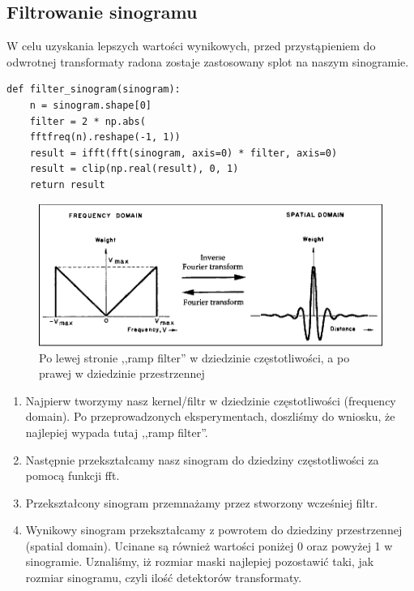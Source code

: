 \documentclass[11pt]{article}
\begin{document}
\subsection{Filtrowanie sinogramu}
W celu uzyskania lepszych wartości wynikowych, przed przystąpieniem do odwrotnej transformaty radona zostaje zastosowany splot na naszym sinogramie.
\begin{verbatim}
def filter_sinogram(sinogram):
    n = sinogram.shape[0]
    filter = 2 * np.abs(
    fftfreq(n).reshape(-1, 1))
    result = ifft(fft(sinogram, axis=0) * filter, axis=0)
    result = clip(np.real(result), 0, 1)
    return result
\end{verbatim}
\begin{figure}[h!]
	\includegraphics[width=\linewidth]{res/ramp_filter.png}
	\caption{Po lewej stronie ,,ramp filter'' w dziedzinie częstotliwości, a po prawej w dziedzinie przestrzennej}
\end{figure}
\begin{enumerate}
    \item Najpierw tworzymy nasz kernel/filtr w dziedzinie częstotliwości (frequency domain). Po przeprowadzonych eksperymentach, doszliśmy do wniosku, że najlepiej wypada tutaj ,,ramp filter''.
    \item Następnie przekształcamy nasz sinogram do dziedziny częstotliwości za pomocą funkcji fft.
    \item Przekształcony sinogram przemnażamy przez stworzony wcześniej filtr.
    \item Wynikowy sinogram przekształcamy z powrotem do dziedziny przestrzennej (spatial domain). Ucinane są również wartości poniżej 0 oraz powyżej 1 w sinogramie.
Uznaliśmy, iż rozmiar maski najlepiej pozostawić taki, jak rozmiar sinogramu, czyli ilość detektorów transformaty.
\end{enumerate}
\end{document}
